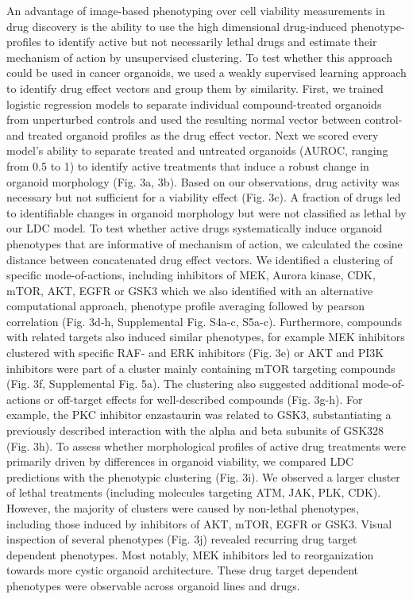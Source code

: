 \begin{flushleft}
An advantage of image-based phenotyping over cell viability measurements in drug discovery is the ability to use the high dimensional drug-induced phenotype-profiles to identify active but not necessarily lethal drugs and estimate their mechanism of action by unsupervised clustering. To test whether this approach could be used in cancer organoids, we used a weakly supervised learning approach to identify drug effect vectors and group them by similarity. First, we trained logistic regression models to separate individual compound-treated organoids from unperturbed controls and used the resulting normal vector between control- and treated organoid profiles as the drug effect vector. Next we scored every model’s ability to separate treated and untreated organoids (AUROC, ranging from 0.5 to 1) to identify active treatments that induce a robust change in organoid morphology (Fig. 3a, 3b). Based on our observations, drug activity was necessary but not sufficient for a viability effect (Fig. 3c). A fraction of drugs led to identifiable changes in organoid morphology but were not classified as lethal by our LDC model. 
To test whether active drugs systematically induce organoid phenotypes that are informative of mechanism of action, we calculated the cosine distance between concatenated drug effect vectors. We identified a clustering of specific mode-of-actions, including inhibitors of MEK, Aurora kinase, CDK, mTOR, AKT, EGFR or GSK3 which we also identified with an alternative computational approach, phenotype profile averaging followed by pearson correlation (Fig. 3d-h, Supplemental Fig. S4a-c, S5a-c). Furthermore, compounds with related targets also induced similar phenotypes, for example MEK inhibitors clustered with specific RAF- and ERK inhibitors (Fig. 3e) or AKT and PI3K inhibitors were part of a cluster mainly containing mTOR targeting compounds (Fig. 3f, Supplemental Fig. 5a). The clustering also suggested additional mode-of-actions or off-target effects for well-described compounds (Fig. 3g-h). For example, the PKC inhibitor enzastaurin was related to GSK3, substantiating a previously described interaction with the alpha and beta subunits of GSK328 (Fig. 3h). To assess whether morphological profiles of active drug treatments were primarily driven by differences in organoid viability, we compared LDC predictions with the phenotypic clustering (Fig. 3i). We observed a larger cluster of lethal treatments (including molecules targeting ATM, JAK, PLK, CDK). However, the majority of clusters were caused by non-lethal phenotypes, including those induced by inhibitors of AKT, mTOR, EGFR or GSK3. Visual inspection of several phenotypes (Fig. 3j) revealed recurring drug target dependent phenotypes. Most notably, MEK inhibitors led to reorganization towards more cystic organoid architecture. These drug target dependent phenotypes were observable across organoid lines and drugs.


\end{flushleft}
